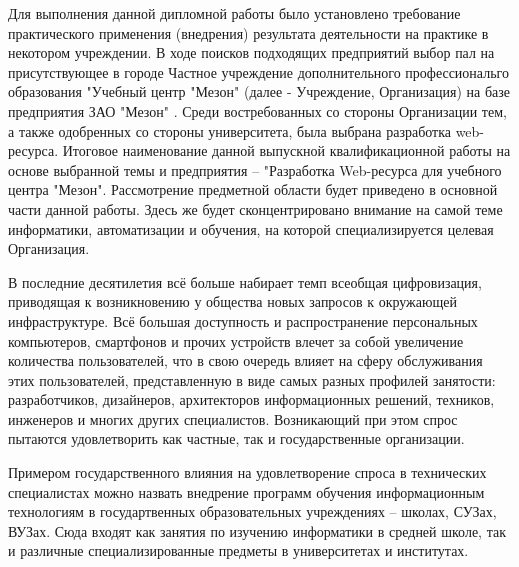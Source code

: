 


Для выполнения данной дипломной работы было установлено требование практического применения (внедрения) результата деятельности на практике в некотором учреждении.
В ходе поисков подходящих предприятий выбор пал на присутствующее в городе Частное учреждение дополнительного профессиональго образования "Учебный центр "Мезон" \cite{meson-uc} (далее - Учреждение, Организация) на базе предприятия ЗАО "Мезон" \cite{meson}.
Среди востребованных со стороны Организации тем, а также одобренных со стороны университета, была выбрана разработка web-ресурса.
Итоговое наименование данной выпускной квалификационной работы на основе выбранной темы и предприятия -- "Разработка Web-ресурса для учебного центра "Мезон".
Рассмотрение предметной области будет приведено в основной части данной работы.
Здесь же будет сконцентрировано внимание на самой теме информатики, автоматизации и обучения, на которой специализируется целевая Организация.

В последние десятилетия всё больше набирает темп всеобщая цифровизация, приводящая к возникновению у общества новых запросов к окружающей инфраструктуре.
Всё большая доступность и распространение персональных компьютеров, смартфонов и прочих устройств влечет за собой увеличение количества пользователей, что в свою очередь влияет на сферу обслуживания этих пользователей, представленную в виде самых разных профилей занятости: разработчиков, дизайнеров, архитекторов информационных решений, техников, инженеров и многих других специалистов.
Возникающий при этом спрос пытаются удовлетворить как частные, так и государственные организации.

Примером государственного влияния на удовлетворение спроса в технических специалистах можно назвать внедрение программ обучения информационным технологиям в государтвенных образовательных учреждениях -- школах, СУЗах, ВУЗах.
Сюда входят как занятия по изучению информатики в средней школе, так и различные специализированные предметы в университетах и институтах.

